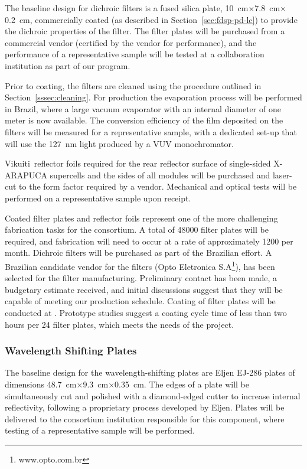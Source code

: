 The baseline design for dichroic filters is 
a fused silica plate,  \SI{10}{cm}$\times$\SI{7.8}{cm}$\times$\SI{0.2}{cm}, commercially coated (as described in Section~\ref{sec:fdsp-pd-lc}) to provide the dichroic properties of the filter.  
The filter plates will be purchased from a commercial vendor (certified by the vendor for performance), and the performance of a representative sample will be tested at a collaboration institution as part of our  program.  

Prior to coating, the filters are cleaned using the procedure outlined in Section~\ref{sssec:cleaning}.
For  production the evaporation process will be performed
in Brazil, where a large vacuum evaporator with an internal diameter of one meter is now available. The conversion efficiency of the film deposited on the filters will be measured for a representative sample, with a dedicated set-up that will use the \SI{127}{nm} light produced by a VUV monochromator.

Vikuiti\texttrademark\ reflector foils required for the rear reflector surface of single-sided X-ARAPUCA supercells and the sides of all modules will be purchased and laser-cut to the form factor required by a vendor.  Mechanical and optical  tests will be performed on a representative sample upon receipt.

Coated filter plates and reflector foils represent one of the more challenging fabrication tasks for the consortium.  A total of \num{48000} filter plates will be required, and fabrication will need to occur at a rate of approximately \num{1200} per month.  Dichroic filters will be purchased as part of the Brazilian effort.  A Brazilian candidate vendor for the filters (Opto Eletronica S.A\footnote{www.opto.com.br}), has been selected for the filter manufacturing.  Preliminary contact has been made, a budgetary estimate received, and initial discussions suggest that they will be capable of meeting our production schedule.  Coating of filter plates will be conducted at .  Prototype studies suggest a coating cycle time of less than two hours per \num{24} filter plates, which meets the needs of the project.

\subsubsection{Wavelength Shifting Plates}

The baseline design for the wavelength-shifting plates are Eljen EJ-286 plates of dimensions \SI{48.7}{cm}$\times$\SI{9.3}{cm}$\times$\SI{0.35}{cm}.  The edges of a plate will be simultaneously cut and polished with a diamond-edged cutter to increase internal reflectivity, following a proprietary process developed by Eljen.  Plates will be delivered to the consortium institution responsible for this component, where  testing of a representative sample will be performed.

